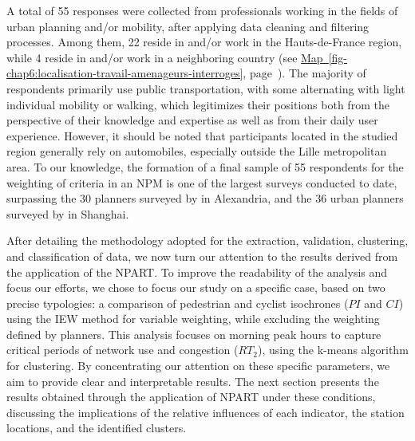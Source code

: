 \begin{refsegment}
A total of 55 responses were collected from professionals working in the fields of urban planning and/or mobility, after applying data cleaning and filtering processes. Among them, 22 reside in and/or work in the Hauts-de-France region, while 4 reside in and/or work in a neighboring country (see \hyperref[fig-chap6:localisation-travail-amenageurs-interroges]{Map~\ref{fig-chap6:localisation-travail-amenageurs-interroges}}, page~\pageref{fig-chap6:localisation-travail-amenageurs-interroges}). The majority of respondents primarily use public transportation, with some alternating with light individual mobility or walking, which legitimizes their positions both from the perspective of their knowledge and expertise as well as from their daily user experience. However, it should be noted that participants located in the studied region generally rely on automobiles, especially outside the Lille metropolitan area. To our knowledge, the formation of a final sample of 55 respondents for the weighting of criteria in an \acrshort{NPM} is one of the largest surveys conducted to date, surpassing the 30 planners surveyed by \textcolor{blue}{\textcite[247]{ibrahim_measuring_2023}} in Alexandria, and the 36 urban planners surveyed by \textcolor{blue}{\textcite[274]{li_transit_2019}} in Shanghai.%

After detailing the methodology adopted for the extraction, validation, clustering, and classification of data, we now turn our attention to the results derived from the application of the \acrshort{NPART}. To improve the readability of the analysis and focus our efforts, we chose to focus our study on a specific case, based on two precise typologies: a comparison of pedestrian and cyclist isochrones (\(PI\) and \(CI\)) using the \acrshort{IEW} method for variable weighting, while excluding the weighting defined by planners. This analysis focuses on morning peak hours to capture critical periods of network use and congestion (\(RT_{2}\)), using the k-means algorithm for clustering. By concentrating our attention on these specific parameters, we aim to provide clear and interpretable results. The next section presents the results obtained through the application of \acrshort{NPART} under these conditions, discussing the implications of the relative influences of each indicator, the station locations, and the identified clusters.%


\end{refsegment}
